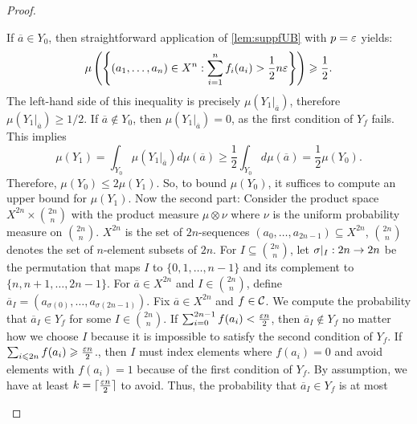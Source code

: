 \begin{proof}
\begin{outline}
        \2 If $\overline{a}\in Y_0$, then straightforward application of \cref{lem:suppfUB} with $p=\varepsilon$ yields:
        $$\mu\left(\left\{
        (a_1,\ldots,a_n) \in X^n :
        \sum^n_{i=1} f_i(a_i) > \frac{1}{2}n\varepsilon 
        \right\}\right)
        \geqslant \frac{1}{2}.$$
        The left-hand side of this inequality is precisely $\mu(Y_1|_{\overline{a}})$, therefore $\mu(Y_1|_{\overline{a}})\geq 1/2$.
        \2 If $\overline{a}\not\in Y_0$, then $\mu(Y_1|_{\overline{a}})=0$, as the first condition of $Y_f$ fails.
        \2 This implies
        $$\mu(Y_1)=\int_{Y_0} \mu(Y_1|_{\overline{a}})d\mu(\overline{a}) \geq \frac{1}{2}\int_{Y_0}d\mu(\overline{a}) = \frac{1}{2}\mu(Y_0).$$
        Therefore, $\mu(Y_0)\leq 2\mu(Y_1)$. So, to bound $\mu(Y_0)$, it suffices to compute an upper bound for $\mu(Y_1)$.
\0 Now the second part:
    \1 Consider the product space $X^{2n} \times \binom{2n}{n}$ with the product measure $\mu \otimes \nu$ where $\nu$ is the uniform probability measure on $\binom{2n}{n}$.
        \2 $X^{2n}$ is the set of $2n$-sequences $(a_0,\ldots,a_{2n-1})\subseteq X^{2n}$,
        \2 $\binom{2n}{n}$ denotes the set of $n$-element subsets of $2n$.
        \2 For $I\subseteq \binom{2n}{n}$, let $\sigma|_I: 2n \rightarrow 2n$ be the permutation that maps $I$ to $\{0,1,\ldots,n-1\}$ and its complement to $\{n,n+1,\ldots,2n-1\}$. 
        \2 For $\overline{a}\in X^{2n}$ and $I\in\binom{2n}{n}$, define $\overline{a}_I=(a_{\sigma(0)},\ldots, a_{\sigma(2n-1)})$.
    \1 Fix $\overline{a}\in X^{2n}$ and $f\in \mathcal{C}$. We compute the probability that $\overline{a}_I\in Y_f$ for some $I\in\binom{2n}{n}$. 
        \2 If $\sum_{i=0}^{2n-1}f(a_i) < \frac{\varepsilon n}{2}$, then $\overline{a}_I\not\in Y_f$ no matter how we choose $I$ because it is impossible to satisfy the second condition of $Y_f$.
        \2 If $\sum_{i\leqslant 2n}f(a_i) \geqslant \frac{\varepsilon n}{2}$., then $I$ must index elements where $f(a_i) = 0$ and avoid elements with $f(a_i)=1$ because of the first condition of $Y_f$. By assumption, we have at least $k=\lceil\frac{\varepsilon n}{2}\rceil$ to avoid. Thus, the probability that $\overline{a}_I\in Y_f$ is at most

\end{outline}
\end{proof}
